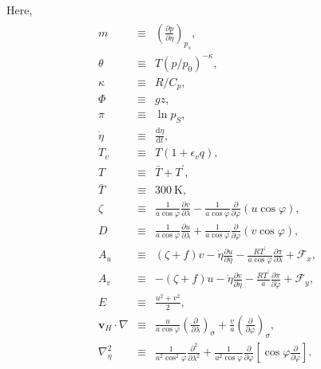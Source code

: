 Here, \begin{eqnarray}\begin{aligned}
m &\equiv & \left(\frac{\partial p}{\partial \eta}\right)_{p_s}, \\
\theta  &\equiv &  T \left( p/p_{0} \right)^{-\kappa}, \\
\kappa  &\equiv &  R/C_{p}, \\
  \Phi  &\equiv &  gz, \\
   \pi  &\equiv &  \ln p_{S}, \\
 \dot{\eta}  &\equiv &   \frac{\mathrm{d}\eta}{\mathrm{d}t}, \\
     T_v  &\equiv &  T ( 1+\epsilon_v q ), \\
     T  &\equiv &   \bar{T} + T^{\prime}, \\
     \bar{T}&\equiv & 300 \ \mathrm{K}, \\
 \zeta  &\equiv &  \frac{1}{a \cos\varphi }
                    \frac{\partial v}{\partial \lambda} 
             -    \frac{1}{a \cos\varphi }
                    \frac{\partial }{\partial \varphi}
                    ( u \cos\varphi ), \\
     D  &\equiv &  \frac{1}{a \cos\varphi }
                    \frac{\partial u}{\partial \lambda} 
             +    \frac{1}{a \cos\varphi }
                    \frac{\partial }{\partial \varphi}
                    ( v \cos\varphi ), \\
    A_u  &\equiv &   ( \zeta + f ) v
             - \dot{\eta} \frac{\partial u}{\partial \eta} 
             - \frac{RT^{\prime}}{a\cos\varphi} 
                  \frac{\partial \pi}{\partial \lambda} 
             + {\mathcal F}_x, \\
    A_v  &\equiv &  - ( \zeta + f ) u
             - \dot{\eta} \frac{\partial v}{\partial \eta} 
             - \frac{RT^{\prime}}{a}
                  \frac{\partial \pi}{\partial \varphi} 
             + {\mathcal F}_y, \\
     E  &\equiv &   \frac{u^{2}+v^{2}}{2}, \\
 {\mathbf{v}}_{H} \cdot \nabla
        &\equiv &  \frac{u}{a \cos \varphi} 
         \left( \frac{\partial }{\partial \lambda} \right)_{\sigma}
     + \frac{v}{a}
         \left( \frac{\partial }{\partial \varphi} \right)_{\sigma}, \\
  \nabla^{2}_{\eta}  
        &\equiv &  
               \frac{1}{a^{2}\cos^2\varphi} 
                 \frac{\partial^{2} }{\partial \lambda^{2}} 
             + \frac{1}{a^{2}\cos\varphi} 
                 \frac{\partial }{\partial \varphi}
                 \left[ \cos\varphi
                       \frac{\partial }{\partial \varphi} \right].\end{aligned}\end{eqnarray}

